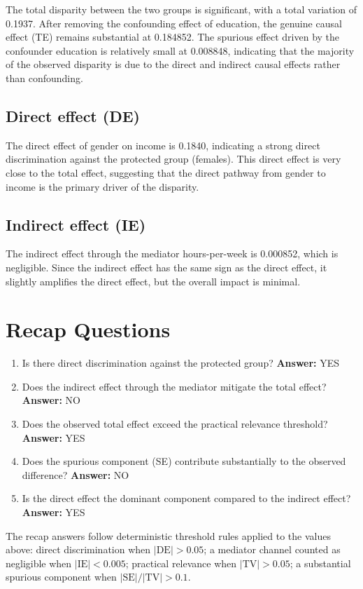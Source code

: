 \documentclass[11pt]{article}
\begin{document}
The total disparity between the two groups is significant, with a total variation of 0.1937. After removing the confounding effect of education, the genuine causal effect (TE) remains substantial at 0.184852. The spurious effect driven by the confounder education is relatively small at 0.008848, indicating that the majority of the observed disparity is due to the direct and indirect causal effects rather than confounding.

\subsection{Direct effect (DE)}

The direct effect of gender on income is 0.1840, indicating a strong direct discrimination against the protected group (females). This direct effect is very close to the total effect, suggesting that the direct pathway from gender to income is the primary driver of the disparity.

\subsection{Indirect effect (IE)}

The indirect effect through the mediator hours-per-week is 0.000852, which is negligible. Since the indirect effect has the same sign as the direct effect, it slightly amplifies the direct effect, but the overall impact is minimal.

\section{Recap Questions}

\begin{enumerate}
\item Is there direct discrimination against the protected group? \textbf{Answer:} YES
\item Does the indirect effect through the mediator mitigate the total effect? \textbf{Answer:} NO
\item Does the observed total effect exceed the practical relevance threshold? \textbf{Answer:} YES
\item Does the spurious component (SE) contribute substantially to the observed difference? \textbf{Answer:} NO
\item Is the direct effect the dominant component compared to the indirect effect? \textbf{Answer:} YES
\end{enumerate}

\vspace{1em}
\noindent\footnotesize
The recap answers follow deterministic threshold rules applied to the values above: direct discrimination when $|\mathrm{DE}| > 0.05$; a mediator channel counted as negligible when $|\mathrm{IE}| < 0.005$; practical relevance when $|\mathrm{TV}| > 0.05$; a substantial spurious component when $|\mathrm{SE}| / |\mathrm{TV}| > 0.1$.
\end{document}
